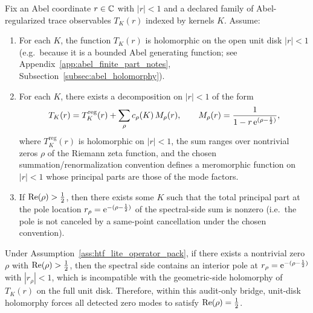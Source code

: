 \begin{assumption}
\label{ass:htf_lite_operator_pack}
Fix an Abel coordinate $r\in\mathbb{C}$ with $|r|<1$ and a declared family of Abel-regularized trace observables $T_K(r)$ indexed by kernels $K$.
Assume:
\begin{enumerate}
\item[\textbf{(H1) Geometric-side unit-disk holomorphy.}]
For each $K$, the function $T_K(r)$ is holomorphic on the open unit disk $|r|<1$ (e.g.\ because it is a bounded Abel generating function;
see Appendix~\ref{app:abel_finite_part_notes}, Subsection~\ref{subsec:abel_holomorphy}).
\item[\textbf{(H2) Meromorphic bridge with zero-mode factors.}]
For each $K$, there exists a decomposition on $|r|<1$ of the form
\[
T_K(r)=T_K^{\mathrm{reg}}(r)+\sum_{\rho} c_\rho(K)\,M_\rho(r),
\qquad
M_\rho(r)=\frac{1}{1-r\,\mathrm{e}^{(\rho-\frac12)}},
\]
where $T_K^{\mathrm{reg}}(r)$ is holomorphic on $|r|<1$, the sum ranges over nontrivial zeros $\rho$ of the Riemann zeta function,
and the chosen summation/renormalization convention defines a meromorphic function on $|r|<1$ whose principal parts are those of the mode factors.
\item[\textbf{(H3) Detectability / noncancellation gate.}]
If $\operatorname{Re}(\rho)>\tfrac12$, then there exists some $K$ such that the total principal part at the pole location $r_\rho=\mathrm{e}^{-(\rho-\frac12)}$
of the spectral-side sum is nonzero (i.e.\ the pole is not canceled by a same-point cancellation under the chosen convention).
\end{enumerate}
\end{assumption}

\begin{remark}
\AuditTag Under Assumption~\ref{ass:htf_lite_operator_pack}, if there exists a nontrivial zero $\rho$ with $\operatorname{Re}(\rho)>\tfrac12$,
then the spectral side contains an interior pole at $r_\rho=\mathrm{e}^{-(\rho-\frac12)}$ with $|r_\rho|<1$,
which is incompatible with the geometric-side holomorphy of $T_K(r)$ on the full unit disk.
Therefore, within this audit-only bridge, unit-disk holomorphy forces all detected zero modes to satisfy $\operatorname{Re}(\rho)=\tfrac12$.
\end{remark}

